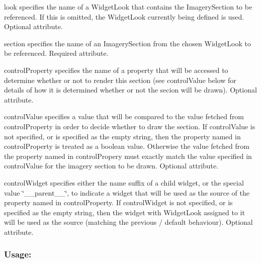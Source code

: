 \begin{DoxyItemize}
\item {\ttfamily look} specifies the name of a Widget\+Look that contains the Imagery\+Section to be referenced. If this is omitted, the Widget\+Look currently being defined is used. Optional attribute. \item {\ttfamily section} specifies the name of an Imagery\+Section from the chosen Widget\+Look to be referenced. Required attribute. \item {\ttfamily control\+Property} specifies the name of a property that will be accessed to determine whether or not to render this section (see {\ttfamily control\+Value} below for details of how it is determined whether or not the secion will be drawn). Optional attribute. \item {\ttfamily control\+Value} specifies a value that will be compared to the value fetched from {\ttfamily control\+Property} in order to decide whether to draw the section. If {\ttfamily control\+Value} is not specified, or is specified as the empty string, then the property named in {\ttfamily control\+Property} is treated as a boolean value. Otherwise the value fetched from the property named in {\ttfamily control\+Propery} must exactly match the value specified in {\ttfamily control\+Value} for the imagery section to be drawn. Optional attribute. \item {\ttfamily control\+Widget} specifies either the name suffix of a child widget, or the special value {\ttfamily \char`\"{}\+\_\+\+\_\+parent\+\_\+\+\_\+\char`\"{}}, to indicate a widget that will be used as the source of the property named in {\ttfamily control\+Property}. If {\ttfamily control\+Widget} is not specified, or is specified as the empty string, then the widget with Widget\+Look assigned to it will be used as the source (matching the previous / default behaviour). Optional attribute.\end{DoxyItemize}
\hypertarget{fal_element_ref_fal_elem_ref_sec_29_3}{}\subsubsection{Usage\+:}\label{fal_element_ref_fal_elem_ref_sec_29_3}

